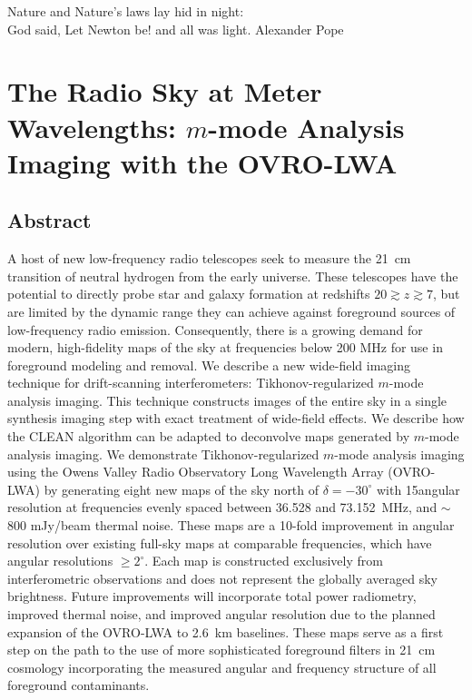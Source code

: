 \cleartoevenpage

\myepigraph
{Nature and Nature's laws lay hid in night:\\God said, Let Newton be! and all was light.}
{Alexander Pope}

\chapter{The Radio Sky at Meter Wavelengths: $m$-mode Analysis Imaging with the OVRO-LWA}
\label{chapter3}


\begin{bibunit}

\section*{Abstract}
A host of new low-frequency radio telescopes seek to measure the 21~cm transition of neutral
hydrogen from the early universe.  These telescopes have the potential to directly probe star and
galaxy formation at redshifts $20 \gtrsim z \gtrsim 7$, but are limited by the dynamic range they
can achieve against foreground sources of low-frequency radio emission. Consequently, there is a
growing demand for modern, high-fidelity maps of the sky at frequencies below 200 MHz for use in
foreground modeling and removal.  We describe a new wide-field imaging technique for drift-scanning
interferometers: Tikhonov-regularized $m$-mode analysis imaging.  This technique constructs images
of the entire sky in a single synthesis imaging step with exact treatment of wide-field effects.  We
describe how the CLEAN algorithm can be adapted to deconvolve maps generated by $m$-mode analysis
imaging. We demonstrate Tikhonov-regularized $m$-mode analysis imaging using the Owens Valley Radio
Observatory Long Wavelength Array (OVRO-LWA) by generating eight new maps of the sky north of
$\delta=-30^\circ$ with 15\arcmin angular resolution at frequencies evenly spaced between 36.528 and
73.152~MHz, and $\sim$800 mJy/beam thermal noise.  These maps are a 10-fold improvement in angular
resolution over existing full-sky maps at comparable frequencies, which have angular resolutions
$\ge 2^\circ$. Each map is constructed exclusively from interferometric observations and does not
represent the globally averaged sky brightness. Future improvements will incorporate total power
radiometry, improved thermal noise, and improved angular resolution due to the planned expansion of
the OVRO-LWA to 2.6~km baselines.  These maps serve as a first step on the path to the use of more
sophisticated foreground filters in 21~cm cosmology incorporating the measured angular and frequency
structure of all foreground contaminants.


\end{bibunit}
